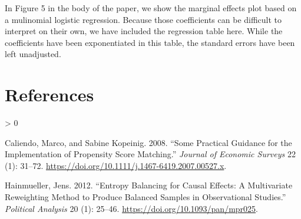\documentclass[
  12pt,
]{article}
\newlength{\cslhangindent}
\newenvironment{CSLReferences}[2] %
 {%
  \setlength{\parindent}{0pt}
  \ifodd #1 \everypar{\setlength{\hangindent}{\cslhangindent}}\ignorespaces\fi
  \ifnum #2 > 0
  \setlength{\parskip}{#2\baselineskip}
  \fi
 }%
 {}
\begin{document}
In Figure 5 in the body of the paper, we show the marginal effects plot based on a mulinomial logistic regression. Because those coefficients can be difficult to interpret on their own, we have included the regression table here. While the coefficients have been exponentiated in this table, the standard errors have been left unadjusted.

\begin{singlespace}

\end{singlespace}

\hypertarget{references}{%
\section*{References}\label{references}}

\hypertarget{refs}{}
\begin{CSLReferences}{1}{0}
\leavevmode\hypertarget{ref-Caliendo2008}{}%
Caliendo, Marco, and Sabine Kopeinig. 2008. {``Some {Practical Guidance} for the {Implementation} of {Propensity Score Matching}.''} \emph{Journal of Economic Surveys} 22 (1): 31--72. \url{https://doi.org/10.1111/j.1467-6419.2007.00527.x}.

\leavevmode\hypertarget{ref-Hainmueller2012}{}%
Hainmueller, Jens. 2012. {``Entropy {Balancing} for {Causal Effects}: A {Multivariate Reweighting Method} to {Produce Balanced Samples} in {Observational Studies}.''} \emph{Political Analysis} 20 (1): 25--46. \url{https://doi.org/10.1093/pan/mpr025}.

\end{CSLReferences}
\end{document}
